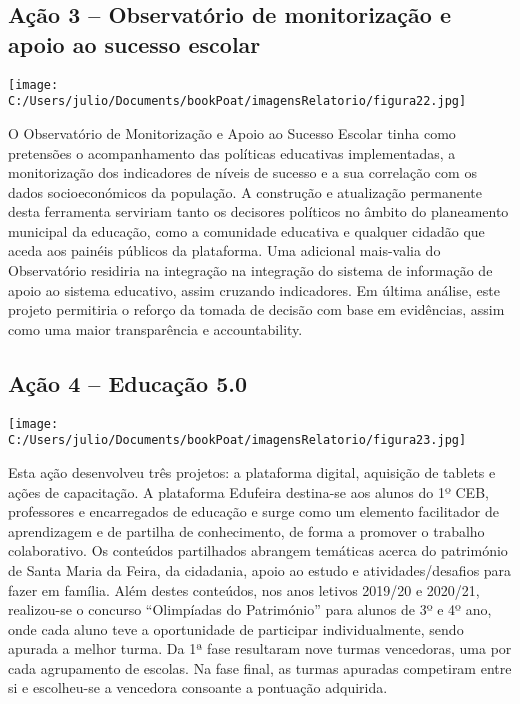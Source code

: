 \documentclass[
]{book}
\begin{document}
\hypertarget{auxe7uxe3o-3-observatuxf3rio-de-monitorizauxe7uxe3o-e-apoio-ao-sucesso-escolar}{%
\subsection{\texorpdfstring{\textbf{Ação 3 -- Observatório de monitorização e apoio ao sucesso escolar}}{Ação 3 -- Observatório de monitorização e apoio ao sucesso escolar}}\label{auxe7uxe3o-3-observatuxf3rio-de-monitorizauxe7uxe3o-e-apoio-ao-sucesso-escolar}}

\texttt{[image: C:/Users/julio/Documents/bookPoat/imagensRelatorio/figura22.jpg]}

O Observatório de Monitorização e Apoio ao Sucesso Escolar tinha como pretensões o acompanhamento das políticas educativas implementadas, a monitorização dos indicadores de níveis de sucesso e a sua correlação com os dados socioeconómicos da população. A construção e atualização permanente desta ferramenta serviriam tanto os decisores políticos no âmbito do planeamento municipal da educação, como a comunidade educativa e qualquer cidadão que aceda aos painéis públicos da plataforma. Uma adicional mais-valia do Observatório residiria na integração na integração do sistema de informação de apoio ao sistema educativo, assim cruzando indicadores. Em última análise, este projeto permitiria o reforço da tomada de decisão com base em evidências, assim como uma maior transparência e accountability.

\hypertarget{auxe7uxe3o-4-educauxe7uxe3o-5.0}{%
\subsection{\texorpdfstring{\textbf{Ação 4 -- Educação 5.0 }}{Ação 4 -- Educação 5.0 }}\label{auxe7uxe3o-4-educauxe7uxe3o-5.0}}

\texttt{[image: C:/Users/julio/Documents/bookPoat/imagensRelatorio/figura23.jpg]}

Esta ação desenvolveu três projetos: a plataforma digital, aquisição de tablets e ações de capacitação. A plataforma Edufeira destina-se aos alunos do 1º CEB, professores e encarregados de educação e surge como um elemento facilitador de aprendizagem e de partilha de conhecimento, de forma a promover o trabalho colaborativo. Os conteúdos partilhados abrangem temáticas acerca do património de Santa Maria da Feira, da cidadania, apoio ao estudo e atividades/desafios para fazer em família. Além destes conteúdos, nos anos letivos 2019/20 e 2020/21, realizou-se o concurso ``Olimpíadas do Património'' para alunos de 3º e 4º ano, onde cada aluno teve a oportunidade de participar individualmente, sendo apurada a melhor turma. Da 1ª fase resultaram nove turmas vencedoras, uma por cada agrupamento de escolas. Na fase final, as turmas apuradas competiram entre si e escolheu-se a vencedora consoante a pontuação adquirida.
\end{document}

